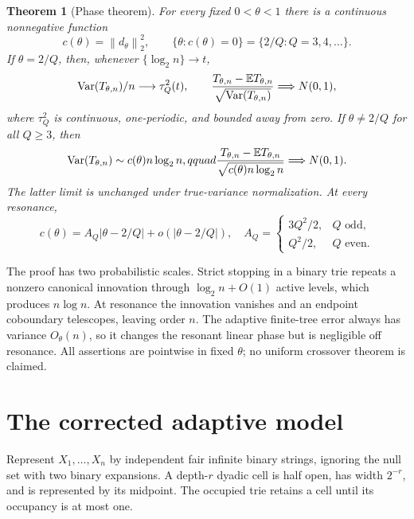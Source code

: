 \documentclass[11pt]{article}
\numberwithin{equation}{section}
\newtheorem{theorem}{Theorem}[section]
\theoremstyle{definition}\newtheorem{definition}[theorem]{Definition}
\theoremstyle{remark}\newtheorem{remark}[theorem]{Remark}
\newcommand{\E}{\mathbb E}\newcommand{\Pp}{\mathbb P}
\newcommand{\Var}{\operatorname {Var}}\newcommand{\Cov}{\operatorname {Cov}}
\newcommand{\1}{\mathbf 1}\newcommand{\cD}{\mathcal D}
\newcommand{\norm}[1]{\left\lVert#1\right\rVert}
\begin{document}
\begin{theorem}[Phase theorem]\label{thm:intro}
For every fixed $0<\theta<1$ there is a continuous nonnegative function
\begin{equation}c(\theta)=\norm{d_\theta}_2^2,\qquad
 \{\theta:c(\theta)=0\}=\{2/Q:Q=3,4,\ldots\}.\label{eq:intro-c}
\end{equation}
If $\theta=2/Q$, then, whenever $\{\log_2n\}\to t$,
\begin{equation}
 \Var(T_{\theta,n})/n\longrightarrow\tau_Q^2(t),\qquad
 {T_{\theta,n}-\E T_{\theta,n}\over\sqrt{\Var(T_{\theta,n})}}
 \Longrightarrow N(0,1),                                      \label{eq:intro-res}
\end{equation}
where $\tau_Q^2$ is continuous, one-periodic, and bounded away from zero.
If $\theta\ne2/Q$ for all $Q\ge3$, then
\begin{equation}
 \Var(T_{\theta,n})\sim c(\theta)n\log_2n,qquad
 {T_{\theta,n}-\E T_{\theta,n}\over
 \sqrt{c(\theta)n\log_2n}}\Longrightarrow N(0,1).             \label{eq:intro-non}
\end{equation}
The latter limit is unchanged under true-variance normalization.  At every
resonance,
\begin{equation}
 c(\theta)=A_Q|\theta-2/Q|+o(|\theta-2/Q|),\quad
 A_Q=\begin{cases}3Q^2/2,&Q\text{ odd},\\Q^2/2,&Q\text{ even}.
 \end{cases}                                                   \label{eq:intro-cusp}
\end{equation}
\end{theorem}

The proof has two probabilistic scales.  Strict stopping in a binary trie
repeats a nonzero canonical innovation through $\log_2n+O(1)$ active levels,
which produces $n\log n$.  At resonance the innovation vanishes and an
endpoint coboundary telescopes, leaving order $n$.  The adaptive finite-tree
error always has variance $O_\theta(n)$, so it changes the resonant linear
phase but is negligible off resonance.  All assertions are pointwise in
fixed $\theta$; no uniform crossover theorem is claimed.

\clearpage
\section{The corrected adaptive model}\label{sec:model}
Represent $X_1,\ldots,X_n$ by independent fair infinite binary strings,
ignoring the null set with two binary expansions.  A depth-$r$ dyadic cell
is half open, has width $2^{-r}$, and is represented by its midpoint.  The
occupied trie retains a cell until its occupancy is at most one.
\end{document}
